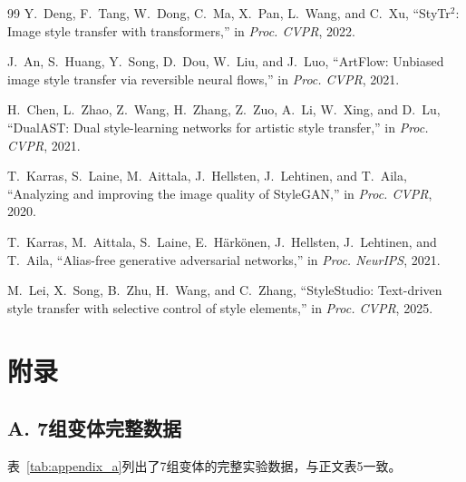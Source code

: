 \documentclass[10pt,twocolumn]{article}
\begin{document}
\begin{thebibliography}{99}
 Y.~Deng, F.~Tang, W.~Dong, C.~Ma, X.~Pan, L.~Wang, and C.~Xu, ``StyTr$^2$: Image style transfer with transformers,'' in \emph{Proc. CVPR}, 2022.

 J.~An, S.~Huang, Y.~Song, D.~Dou, W.~Liu, and J.~Luo, ``ArtFlow: Unbiased image style transfer via reversible neural flows,'' in \emph{Proc. CVPR}, 2021.

 H.~Chen, L.~Zhao, Z.~Wang, H.~Zhang, Z.~Zuo, A.~Li, W.~Xing, and D.~Lu, ``DualAST: Dual style-learning networks for artistic style transfer,'' in \emph{Proc. CVPR}, 2021.

 T.~Karras, S.~Laine, M.~Aittala, J.~Hellsten, J.~Lehtinen, and T.~Aila, ``Analyzing and improving the image quality of StyleGAN,'' in \emph{Proc. CVPR}, 2020.

 T.~Karras, M.~Aittala, S.~Laine, E.~H\"{a}rk\"{o}nen, J.~Hellsten, J.~Lehtinen, and T.~Aila, ``Alias-free generative adversarial networks,'' in \emph{Proc. NeurIPS}, 2021.

 M.~Lei, X.~Song, B.~Zhu, H.~Wang, and C.~Zhang, ``StyleStudio: Text-driven style transfer with selective control of style elements,'' in \emph{Proc. CVPR}, 2025.

\end{thebibliography}

\FloatBarrier
\section*{附录}
\begingroup
\titlespacing*{\subsection}{0pt}{0.45em}{0.2em}

\subsection*{A. 7组变体完整数据}

表~\ref{tab:appendix_a}列出了7组变体的完整实验数据，与正文表5一致。
\end{document}
